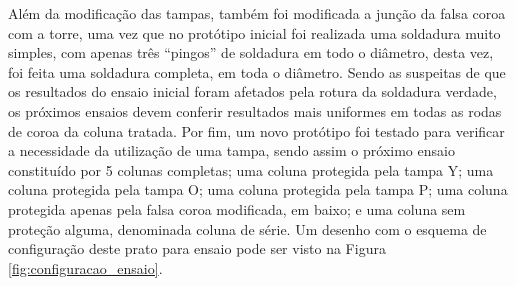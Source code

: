 \par
Além da modificação das tampas, também foi modificada a junção da falsa coroa com a torre, uma vez que no protótipo inicial foi realizada uma soldadura muito simples, com apenas três “pingos” de soldadura em todo o diâmetro, desta vez, foi feita uma soldadura completa, em toda o diâmetro. Sendo as suspeitas de que os resultados do ensaio inicial foram afetados pela rotura da soldadura verdade, os próximos ensaios devem conferir resultados mais uniformes em todas as rodas de coroa da coluna tratada. Por fim, um novo protótipo foi testado para verificar a necessidade da utilização de uma tampa, sendo assim o próximo ensaio constituído por 5 colunas completas; uma coluna protegida pela tampa Y; uma coluna protegida pela tampa O; uma coluna protegida pela tampa P; uma coluna protegida apenas pela falsa coroa modificada, em baixo; e uma coluna sem proteção alguma, denominada coluna de série. Um desenho com o esquema de configuração deste prato para ensaio pode ser visto na Figura \ref{fig:configuracao_ensaio}.
